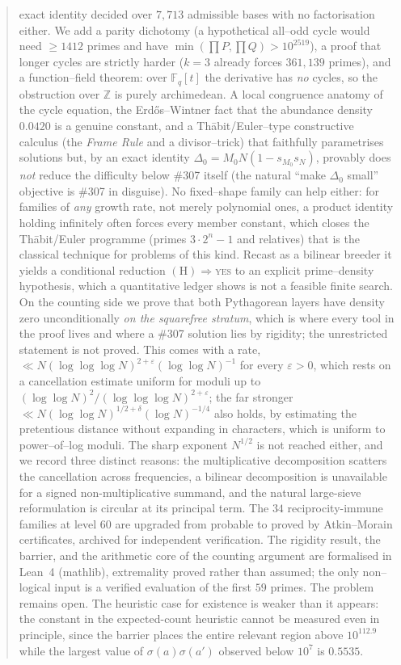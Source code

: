 \documentclass[11pt]{article}
\theoremstyle{definition}
\begin{document}
\begin{abstract}
exact identity decided over $7{,}713$ admissible bases with no factorisation either. We add a parity dichotomy (a hypothetical all--odd
cycle would need $\ge 1412$ primes and have $\min(\prod P,\prod Q)>10^{2519}$), a proof that longer
cycles are strictly harder ($k=3$ already forces $361{,}139$ primes), and a function--field theorem:
over $\mathbb{F}_q[t]$ the derivative has \emph{no} cycles, so the obstruction over $\mathbb{Z}$ is
purely archimedean. A local congruence anatomy of the cycle equation, the Erd\H{o}s--Wintner fact
that the abundance density $0.0420$ is a genuine constant, and a Th\=abit/Euler--type constructive
calculus (the \emph{Frame
Rule} and a divisor--trick) that faithfully parametrises solutions but, by an exact identity
$\Delta_0=M_0N(1-s_{M_0}s_N)$, provably does \emph{not} reduce the difficulty below \#307 itself
(the natural ``make $\Delta_0$ small'' objective is \#307 in disguise). No fixed--shape family can
help either: for families of \emph{any} growth rate, not merely polynomial ones, a product identity
holding infinitely often forces every member constant, which closes the Th\=abit/Euler programme
(primes $3\cdot2^{n}-1$ and relatives) that is the classical technique for problems of this kind. Recast as a bilinear breeder it yields a conditional reduction
$(\mathrm{H})\Rightarrow$\textsc{yes} to an explicit prime--density hypothesis, which a quantitative
ledger shows is not a feasible finite search. On the counting side we prove that both Pythagorean layers have density zero
unconditionally \emph{on the squarefree stratum}, which is where every tool in the proof lives and
where a \#307 solution lies by rigidity; the unrestricted statement is not proved. This comes with a rate,
$\ll N(\log\log\log N)^{2+\varepsilon}(\log\log N)^{-1}$ for every $\varepsilon>0$, which rests on a
cancellation estimate uniform for moduli up to $(\log\log N)^2/(\log\log\log N)^{2+\varepsilon}$; the far stronger
$\ll N(\log\log N)^{1/2+\delta}(\log N)^{-1/4}$ also holds, by estimating the pretentious distance
without expanding in characters, which is uniform to power--of--log moduli. The
sharp exponent $N^{1/2}$ is not reached either, and we record three distinct reasons: the multiplicative decomposition scatters the cancellation across frequencies, a
bilinear decomposition is unavailable for a signed non-multiplicative summand, and the natural
large-sieve reformulation is circular at its principal term. The $34$ reciprocity-immune families at
level $60$ are upgraded from probable to proved by Atkin--Morain certificates, archived for
independent verification. The rigidity result, the barrier, and the arithmetic core of the counting
argument are formalised in Lean~4 (mathlib), extremality proved rather than assumed; the only
non--logical input is a verified evaluation of the first $59$ primes. The problem remains open. The heuristic case for existence is weaker than it appears: the constant in
the expected-count heuristic cannot be measured even in principle, since the barrier places the
entire relevant region above $10^{112.9}$ while the largest value of $\sigma(a)\sigma(a')$ observed
below $10^{7}$ is $0.5535$.
\end{abstract}
\end{document}
